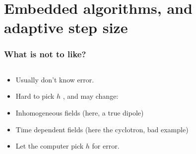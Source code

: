 \documentclass{beamer}
\begin{document}
    \section{Embedded algorithms, and adaptive step size}
\fi


\begin{frame}
\frametitle{What is not to like?}

\begin{columns}
\begin{column}{0.5\linewidth}
\begin{itemize}
\item <2-> Usually don't know error.

\item <2-> Hard to pick $h$ , and may change:

\item <3-> Inhomogeneous fields (here, a true dipole)

\item <4-> Time dependent fields (here the cyclotron, bad example)

\item <5-> Let the computer pick $h$ for error.

\end{itemize}
\end{column}
\begin{column}{0.5\linewidth}


%


\end{column}
\end{columns}
\end{frame}
\end{document}
